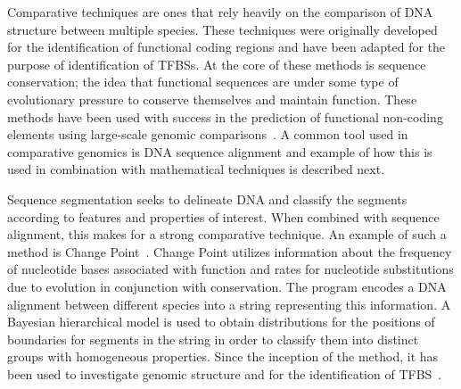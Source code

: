         Comparative techniques are ones that rely heavily on the comparison of DNA structure between multiple species.
        These techniques were originally developed for the identification of functional coding regions and have been adapted for the purpose of identification of TFBSs. At the core of these methods is sequence conservation; the idea that functional sequences are under some type of evolutionary pressure to conserve themselves and maintain function. These methods have been used with success in the prediction of functional non-coding elements using large-scale genomic comparisons~\cite{aparicio2002whole, gottgens2000analysis, loots2000identification, mouse2002initial}. A common tool used in comparative genomics is DNA sequence alignment and example of how this is used in combination with mathematical techniques is described next.

        
        Sequence segmentation seeks to delineate DNA and classify the segments according to features and properties of interest. When combined with sequence alignment, this makes for a strong comparative technique.
        An example of such a method is Change Point~\cite{keith2006segmenting}. Change Point utilizes information about the frequency of nucleotide bases associated with function and rates for nucleotide substitutions due to evolution in conjunction with conservation. The program encodes a DNA alignment between different species into a string representing this information. A Bayesian hierarchical model is used to obtain distributions for the positions of boundaries for segments in the string in order to classify them into distinct groups with homogeneous properties. Since the inception of the method, it has been used to investigate genomic structure and for the identification of TFBS~\cite{algama2014investigating, algama2017genome}. 
        
